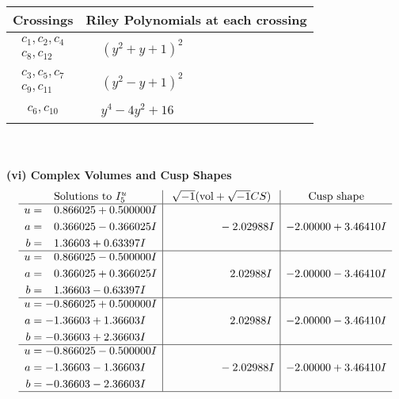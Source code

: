 \documentclass[1p]{elsarticle_modified}
\theoremstyle{definition}
\newcommand{\I}{\sqrt{-1}}
\begin{document}
\begin{tabular}{m{50pt}|m{274pt}}
Crossings & \hspace{64pt}Riley Polynomials at each crossing \\
\hline $$\begin{aligned}c_{1},c_{2},c_{4}\\c_{8},c_{12}\end{aligned}$$&$\begin{aligned}
&(y^2+y+1)^2
\end{aligned}$\\
\hline $$\begin{aligned}c_{3},c_{5},c_{7}\\c_{9},c_{11}\end{aligned}$$&$\begin{aligned}
&(y^2- y+1)^2
\end{aligned}$\\
\hline $$\begin{aligned}c_{6},c_{10}\end{aligned}$$&$\begin{aligned}
&y^4-4 y^2+16
\end{aligned}$\\
\hline
\end{tabular}\\~\\
\newpage\flushleft \textbf{(vi) Complex Volumes and Cusp Shapes}
$$\begin{array}{c|c|c}  
\text{Solutions to }I^u_{5}& \I (\text{vol} + \sqrt{-1}CS) & \text{Cusp shape}\\
 \hline 
\begin{aligned}
u &= \phantom{-}0.866025 + 0.500000 I \\
a &= \phantom{-}0.366025 - 0.366025 I \\
b &= \phantom{-}1.36603 + 0.63397 I\end{aligned}
 & \phantom{-0.000000 } -2.02988 I & -2.00000 + 3.46410 I \\ \hline\begin{aligned}
u &= \phantom{-}0.866025 - 0.500000 I \\
a &= \phantom{-}0.366025 + 0.366025 I \\
b &= \phantom{-}1.36603 - 0.63397 I\end{aligned}
 & \phantom{-0.000000 -}2.02988 I & -2.00000 - 3.46410 I \\ \hline\begin{aligned}
u &= -0.866025 + 0.500000 I \\
a &= -1.36603 + 1.36603 I \\
b &= -0.36603 + 2.36603 I\end{aligned}
 & \phantom{-0.000000 -}2.02988 I & -2.00000 - 3.46410 I \\ \hline\begin{aligned}
u &= -0.866025 - 0.500000 I \\
a &= -1.36603 - 1.36603 I \\
b &= -0.36603 - 2.36603 I\end{aligned}
 & \phantom{-0.000000 } -2.02988 I & -2.00000 + 3.46410 I\\
 \hline 
 \end{array}$$\newpage\newpage\renewcommand{\arraystretch}{1}
\end{document}
